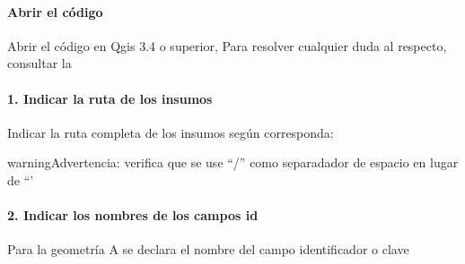 \documentclass[letterpaper,10pt,spanish]{sphinxmanual}
\begin{document}
\paragraph{Abrir el código}
\label{\detokenize{tabulacion_3geo:abrir-el-codigo}}
Abrir el código  en Qgis 3.4 o superior,
Para resolver cualquier duda al respecto, consultar la 

\noindent{}


\paragraph{1. Indicar la ruta de los insumos}
\label{\detokenize{tabulacion_3geo:indicar-la-ruta-de-los-insumos}}
Indicar la ruta completa de los insumos según corresponda:

\begin{sphinxadmonition}{warning}{Advertencia:}
verifica que se use “/” como separadador de espacio en lugar de “'
\end{sphinxadmonition}

\begin{sphinxVerbatim}[commandchars=\\\{\}]
  
  
  
\end{sphinxVerbatim}


\paragraph{2. Indicar los nombres de los campos id}
\label{\detokenize{tabulacion_3geo:indicar-los-nombres-de-los-campos-id}}
Para la geometría A se declara el nombre del campo identificador o clave

\begin{sphinxVerbatim}[commandchars=\\\{\}]
  
\end{sphinxVerbatim}
\end{document}
